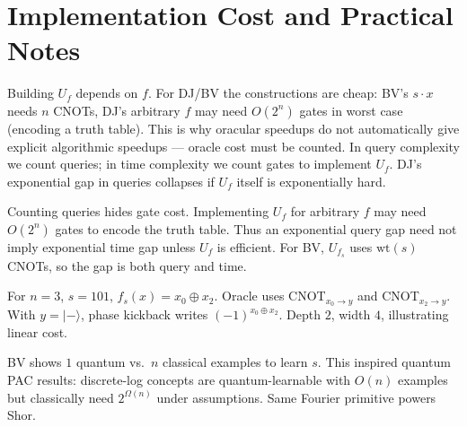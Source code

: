 \section{Implementation Cost and Practical Notes}
Building $U_f$ depends on $f$. For DJ/BV the constructions are cheap: BV's $s\cdot x$ needs $n$ CNOTs, DJ's arbitrary $f$ may need $O(2^n)$ gates in worst case (encoding a truth table). This is why oracular speedups do not automatically give explicit algorithmic speedups --- oracle cost must be counted. In query complexity we count queries; in time complexity we count gates to implement $U_f$. DJ's exponential gap in queries collapses if $U_f$ itself is exponentially hard.


\begin{remark}
Counting queries hides gate cost. Implementing $U_f$ for arbitrary $f$ may need $O(2^n)$ gates to encode the truth table. Thus an exponential query gap need not imply exponential time gap unless $U_f$ is efficient. For BV, $U_{f_s}$ uses $\mathrm{wt}(s)$ CNOTs, so the gap is both query and time.
\end{remark}

\begin{example}[BV oracle for $s=101$]
For $n=3$, $s=101$, $f_s(x)=x_0\oplus x_2$. Oracle uses CNOT$_{x_0\to y}$ and CNOT$_{x_2\to y}$. With $y=\lvert-\rangle$, phase kickback writes $(-1)^{x_0\oplus x_2}$. Depth $2$, width $4$, illustrating linear cost.
\end{example}

\begin{remark}
BV shows $1$ quantum vs.\ $n$ classical examples to learn $s$. This inspired quantum PAC results: discrete-log concepts are quantum-learnable with $O(n)$ examples but classically need $2^{\Omega(n)}$ under assumptions. Same Fourier primitive powers Shor.
\end{remark}

